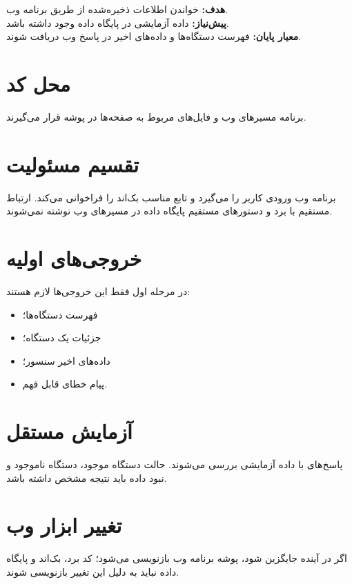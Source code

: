 \begin{phasebox}
\textbf{هدف:} خواندن اطلاعات ذخیره‌شده از طریق برنامه وب.\\
\textbf{پیش‌نیاز:} داده آزمایشی در پایگاه داده وجود داشته باشد.\\
\textbf{معیار پایان:} فهرست دستگاه‌ها و داده‌های اخیر در پاسخ وب دریافت شوند.
\end{phasebox}

\section{محل کد}
برنامه
مسیرهای وب و فایل‌های مربوط به صفحه‌ها در پوشه
قرار می‌گیرند.

\section{تقسیم مسئولیت}
برنامه وب ورودی کاربر را می‌گیرد و تابع مناسب بک‌اند را فراخوانی می‌کند. ارتباط مستقیم با برد و دستورهای مستقیم پایگاه داده در مسیرهای وب نوشته نمی‌شوند.

\section{خروجی‌های اولیه}
در مرحله اول فقط این خروجی‌ها لازم هستند:

\begin{itemize}
    \item فهرست دستگاه‌ها؛
    \item جزئیات یک دستگاه؛
    \item داده‌های اخیر سنسور؛
    \item پیام خطای قابل فهم.
\end{itemize}

\section{آزمایش مستقل}
پاسخ‌های
با داده آزمایشی بررسی می‌شوند. حالت دستگاه موجود، دستگاه ناموجود و نبود داده باید نتیجه مشخص داشته باشد.

\section{تغییر ابزار وب}
اگر در آینده
جایگزین
شود، پوشه برنامه وب بازنویسی می‌شود؛ کد برد، بک‌اند و پایگاه داده نباید به دلیل این تغییر بازنویسی شوند.
